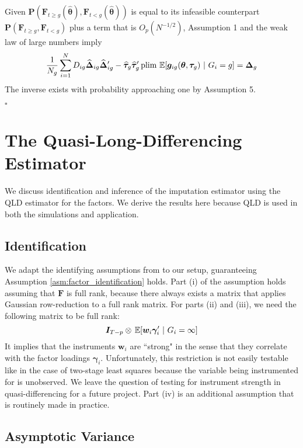 Given $\bm P(\bm{F}_{t \geq g}(\widehat{\bm{\theta}}), \bm{F}_{t < g}(\widehat{\bm{\theta}}))$ is equal to its infeasible counterpart $\bm P(\bm{F}_{t \geq g}, \bm{F}_{t < g})$ plus a term that is $O_p(N^{-1/2})$, Assumption 1 and the weak law of large numbers imply 
\begin{equation*}
    \frac{1}{N_g} \sum_{i = 1}^N D_{ig} \widehat{\bm \Delta}_{ig} \widehat{\bm \Delta}_{ig}' - \widehat{\bm \tau}_g \widehat{\bm \tau}_g' \plim \expec{\bm g_{ig}(\bm{\theta}, \bm \tau_g)}{G_i = g} = \bm \Delta_g
\end{equation*}
The inverse exists with probability approaching one by Assumption 5.

$\square$

\section{The Quasi-Long-Differencing Estimator}

We discuss identification and inference of the imputation estimator using the QLD estimator for the factors. We derive the results here because QLD is used in both the simulations and application. 

\subsection{Identification}

We adapt the identifying assumptions from \citet{Ahn_Lee_Schmidt_2013} to our setup, guaranteeing Assumption \ref{asm:factor_identification} holds. Part (i) of the assumption holds assuming that $\bm F$ is full rank, because there always exists a matrix that applies Gaussian row-reduction to a full rank matrix. For parts (ii) and (iii), we need the following matrix to be full rank: 
\begin{equation}
    \bm I_{T-p} \otimes \expec{\bm w_i \bm \gamma_i'}{G_i = \infty}
\end{equation}
It implies that the instruments $\bm w_i$ are ``strong" in the sense that they correlate with the factor loadings $\bm \gamma_i$. Unfortunately, this restriction is not easily testable like in the case of two-stage least squares because the variable being instrumented for is unobserved. We leave the question of testing for instrument strength in quasi-differencing for a future project. Part (iv) is an additional assumption that is routinely made in practice. 

\subsection{Asymptotic Variance}

